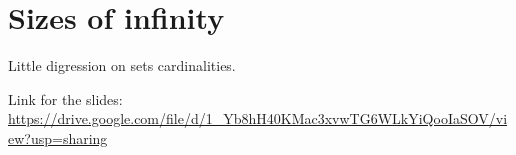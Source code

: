 \section{Sizes of infinity}
Little digression on sets cardinalities.

Link for the slides:\\
\url{https://drive.google.com/file/d/1_Yb8hH40KMac3xvwTG6WLkYiQooIaSOV/view?usp=sharing}
